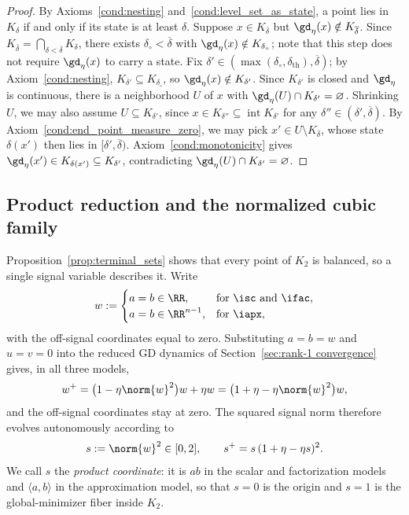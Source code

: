 \documentclass{article}
\begin{document}
\begin{proof}
By Axioms~\ref{cond:nesting} and~\ref{cond:level_set_as_state}, a point
lies in $K_{\delta}$ if and only if its state is at least $\delta$.
Suppose $x\in K_{\overline\delta}$ but
$\gd_\eta(x)\notin K_{\overline\delta}$. Since
$K_{\overline\delta}=\bigcap_{\delta<\overline\delta}K_\delta$, there
exists $\delta_\circ<\overline\delta$ with
$\gd_\eta(x)\notin K_{\delta_\circ}$; note that this step does not require
$\gd_\eta(x)$ to carry a state. Fix
$\delta'\in(\max(\delta_\circ,\delta_{\mathrm{th}}),\overline\delta)$;
by Axiom~\ref{cond:nesting}, $K_{\delta'}\subseteq K_{\delta_\circ}$, so
$\gd_\eta(x)\notin K_{\delta'}$. Since $K_{\delta'}$ is closed and
$\gd_\eta$ is continuous, there is a neighborhood $U$ of $x$ with
$\gd_\eta(U)\cap K_{\delta'}=\varnothing$. Shrinking $U$, we may also assume
$U\subseteq K_{\delta'}$, since
$x\in K_{\delta''}\subseteq\operatorname{int}K_{\delta'}$ for any
$\delta''\in(\delta',\overline\delta)$. By
Axiom~\ref{cond:end_point_measure_zero}, we may pick
$x'\in U\setminus K_{\overline\delta}$, whose state $\delta(x')$ then lies
in $[\delta',\overline\delta)$. Axiom~\ref{cond:monotonicity} gives
$\gd_\eta(x')\in K_{\delta(x')}\subseteq K_{\delta'}$, contradicting
$\gd_\eta(U)\cap K_{\delta'}=\varnothing$.
\end{proof}

\subsection{Product reduction and the normalized cubic family}
\label{subsec:terminal_reduced_map}

Proposition~\ref{prop:terminal_sets} shows that every point of $K_2$ is
balanced, so a single signal variable describes it. Write
\begin{align}
    w :=
    \begin{cases}
        a=b\in\RR, & \text{for } \isc \text{ and } \ifac,\\
        a=b\in\RR^{n-1}, & \text{for } \iapx,
    \end{cases}
\end{align}
with the off-signal coordinates equal to zero. Substituting $a=b=w$ and
$u=v=0$ into the reduced GD dynamics of
Section~\ref{sec:rank-1 convergence} gives, in all three models,
\begin{align}
    w^+ = \bigl(1-\eta\norm{w}^2\bigr)w+\eta w
        = \bigl(1+\eta-\eta\norm{w}^2\bigr)w,
    \label{eq:balanced_update}
\end{align}
and the off-signal coordinates stay at zero. The squared signal norm therefore
evolves autonomously according to
\begin{align}
    s := \norm{w}^2\in[0,2],
    \qquad
    s^+ = s\,(1+\eta-\eta s)^2 .
    \label{eq:s_update}
\end{align}
We call $s$ the \emph{product coordinate}: it is $ab$ in the scalar and
factorization models and $\langle a,b\rangle$ in the approximation model, so that
$s=0$ is the origin and $s=1$ is the global-minimizer fiber inside $K_2$.
\end{document}
